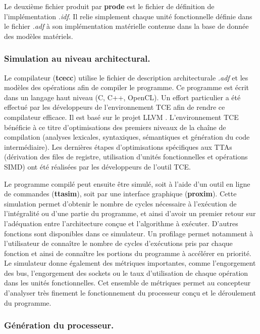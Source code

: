 Le deuxième fichier produit par \textbf{prode} est le fichier de définition de l'implémentation \textit{.idf}. Il relie simplement chaque unité fonctionnelle définie dans le fichier \textit{.adf} à son implémentation matérielle contenue dans la base de donnée des modèles matériels.

\subsubsection{Simulation au niveau architectural.}

Le compilateur (\textbf{tcecc}) utilise le fichier de description architecturale \textit{.adf} et les modèles des opérations afin de compiler le programme. Ce programme est écrit dans un langage haut niveau (C, C++, OpenCL). Un effort particulier a été effectué par les développeurs de l'environnement TCE afin de rendre ce compilateur efficace. Il est basé sur le projet LLVM \cite{lattner_llvm:_2004}. L'environnement TCE bénéficie à ce titre d'optimisations des premiers niveaux de la chaîne de compilation (analyses lexicales, syntaxiques, sémantiques et génération du code intermédiaire). Les dernières étapes d'optimisations spécifiques aux TTAs (dérivation des files de registre, utilisation d'unités fonctionnelles et opérations SIMD) ont été réalisées par les développeurs de l'outil TCE.

Le programme compilé peut ensuite être simulé, soit à l'aide d'un outil en ligne de commandes (\textbf{ttasim}), soit par une interface graphique (\textbf{proxim}). Cette simulation permet d'obtenir le nombre de cycles nécessaire à l'exécution de l'intégralité ou d'une partie du programme, et ainsi d'avoir un premier retour sur l'adéquation entre l'architecture conçue et l'algorithme à exécuter. D'autres fonctions sont disponibles dans ce simulateur. Un profilage permet notamment à l'utilisateur de connaître le nombre de cycles d'exécutions pris par chaque fonction et ainsi de connaître les portions du programme à accélérer en priorité. Le simulateur donne également des métriques importantes, comme l'engorgement des bus, l'engorgement des sockets ou le taux d'utilisation de chaque opération dans les unités fonctionnelles. Cet ensemble de métriques permet au concepteur d'analyser très finement le fonctionnement du processeur conçu et le déroulement du programme.

\subsubsection{Génération du processeur.}

